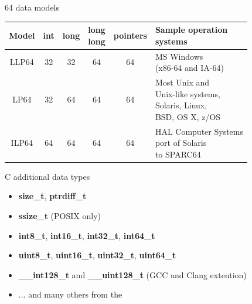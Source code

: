\begin{frame}{64 data models}
    \begin{center}
        \begin{tabular}{c|c|c|c|c|l}
            Model   & int & long & \specialcell{long \\ long} & pointers & \specialcell{Sample operation \\systems} \\ \hline
            LLP64   &  32 & 32   & 64                         & 64       & \specialcellhl{MS Windows \\ (x86-64 and IA-64)} \\
            LP64    &  32 & 64   & 64                         & 64       & \specialcellhl{Most Unix and \\ Unix-like systems, \\ Solaris, Linux, \\ BSD, OS X, z/OS} \\
            ILP64   &  64 & 64   & 64                         & 64       & \specialcellhl{HAL Computer Systems \\ port of Solaris  \\ to SPARC64} \\
        \end{tabular}
    \end{center}
\end{frame}
\begin{frame}{C additional data types}
    \begin{itemize}
        \item \textbf{size\_t}, \textbf{ptrdiff\_t}
        \item \textbf{ssize\_t} (POSIX only)
        \item \textbf{int8\_t}, \textbf{int16\_t}, \textbf{int32\_t}, \textbf{int64\_t}
        \item \textbf{uint8\_t}, \textbf{uint16\_t}, \textbf{uint32\_t}, \textbf{uint64\_t}
        \item \textbf{\_\_int128\_t} and \textbf{\_\_uint128\_t} (GCC and Clang extention)
        \item ... and many others from the 
    \end{itemize}
\end{frame}
